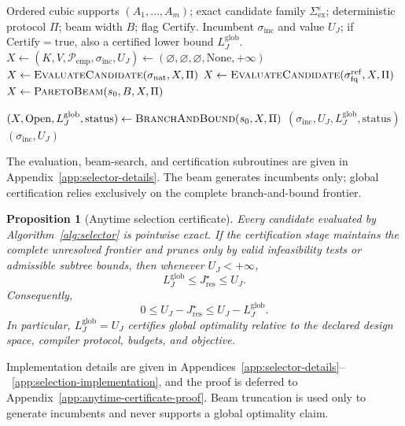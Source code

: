 \documentclass[a4paper,onecolumn,11pt,unpublished]{quantumarticle}
\newtheorem{proposition}[proposition]{Proposition}
\theoremstyle{remark}
\begin{document}
\begin{algorithm}[H]
\caption{Compiler-aware representation selector}
\label{alg:selector}
\begin{algorithmic}[1]
\Require Ordered cubic supports $(A_1,\ldots,A_m)$; exact candidate family
$\Sigma_{\mathrm{ex}}^\varepsilon$; deterministic protocol $\Pi$;
beam width $B$; flag $\mathrm{Certify}$.
\Ensure Incumbent $\sigma_{\mathrm{inc}}$ and value $U_J$;
if $\mathrm{Certify}=\mathrm{true}$, also a certified lower bound
$L_J^{\mathrm{glob}}$.
\State $X\gets(K,V,\mathcal P_{\mathrm{emp}},\sigma_{\mathrm{inc}},U_J)
      \gets(\varnothing,\varnothing,\varnothing,\mathrm{None},+\infty)$
\State $X\gets\Call{EvaluateCandidate}{\sigma_{\mathrm{nat}},X,\Pi}$
\State $X\gets\Call{EvaluateCandidate}{\sigma_{\mathrm{fq}}^{\mathrm{ref}},X,\Pi}$
\State $X\gets\Call{ParetoBeam}{s_0,B,X,\Pi}$

    \State $(X,\mathrm{Open},L_J^{\mathrm{glob}},\mathrm{status})
    \gets\Call{BranchAndBound}{s_0,X,\Pi}$
    \State \Return $(\sigma_{\mathrm{inc}},U_J,L_J^{\mathrm{glob}},
    \mathrm{status})$
\Else
    \State \Return $(\sigma_{\mathrm{inc}},U_J)$
\EndIf
\end{algorithmic}
\end{algorithm}
The evaluation, beam-search, and certification subroutines are given in
Appendix~\ref{app:selector-details}. The beam generates incumbents only;
global certification relies exclusively on the complete branch-and-bound
frontier.


\begin{proposition}[Anytime selection certificate]
\label{prop:anytime-certificate}
Every candidate evaluated by Algorithm~\ref{alg:selector} is pointwise exact.
If the certification stage maintains the complete unresolved frontier and
prunes only by valid infeasibility tests or admissible subtree bounds, then
whenever $U_J<+\infty$,
\begin{equation}
L_J^{\mathrm{glob}}
\le
J_{\mathrm{res}}^\star
\le
U_J.
\label{eq:anytime-certificate}
\end{equation}
Consequently,
\[
0\le
U_J-J_{\mathrm{res}}^\star
\le
U_J-L_J^{\mathrm{glob}}.
\]
In particular, $L_J^{\mathrm{glob}}=U_J$ certifies global optimality relative
to the declared design space, compiler protocol, budgets, and objective.
\end{proposition}
Implementation details are given in Appendices~\ref{app:selector-details}--~\ref{app:selection-implementation}, and the proof is
deferred to Appendix~\ref{app:anytime-certificate-proof}. Beam truncation is used only to generate
incumbents and never supports a global optimality claim.
\end{document}
